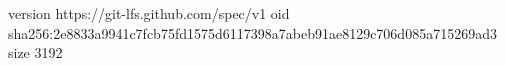 version https://git-lfs.github.com/spec/v1
oid sha256:2e8833a9941c7fcb75fd1575d6117398a7abeb91ae8129c706d085a715269ad3
size 3192
